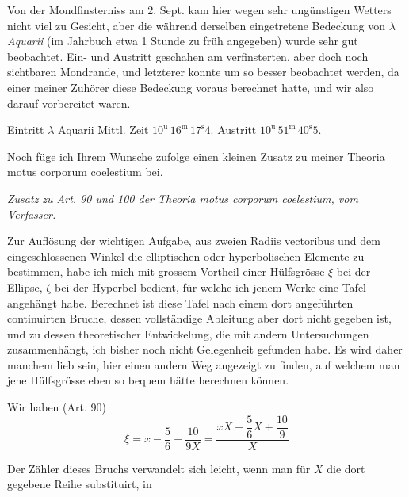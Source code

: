 \par\indent Von der Mondfinsterniss am 2. Sept. kam hier wegen sehr ungünstigen Wetters nicht viel zu Gesicht, aber die während derselben eingetretene Bedeckung von $\lambda$ \emph{Aquarii} (im Jahrbuch etwa 1 Stunde zu früh angegeben) wurde sehr gut beobachtet. Ein- und Austritt geschahen am verfinsterten, aber doch noch sichtbaren Mondrande, und letzterer konnte um so besser beobachtet werden, da einer meiner Zuhörer diese Bedeckung voraus berechnet hatte, und wir also darauf vorbereitet waren.

\par\indent Eintritt $\lambda$ Aquarii Mittl. Zeit $10^{\mathrm u}\,16^{\mathrm m}\,17^{\mathrm s}4$. Austritt $10^{\mathrm u}\,51^{\mathrm m}\,40^{\mathrm s}5$.

\par\indent Noch füge ich Ihrem Wunsche zufolge einen kleinen Zusatz zu meiner Theoria motus corporum coelestium bei.
\begin{center}\emph{Zusatz zu Art. 90 und 100 der Theoria motus corporum coelestium, vom Verfasser.}\end{center}
\par\indent Zur Auflösung der wichtigen Aufgabe, aus zweien Radiis vectoribus und dem eingeschlossenen Winkel die elliptischen oder hyperbolischen Elemente zu bestimmen, habe ich mich mit grossem Vortheil einer Hülfsgrösse $\xi$ bei der Ellipse, $\zeta$ bei der Hyperbel bedient, für welche ich jenem Werke eine Tafel angehängt habe. Berechnet ist diese Tafel nach einem dort angeführten continuirten Bruche, dessen vollständige Ableitung aber dort nicht gegeben ist, und zu dessen theoretischer Entwickelung, die mit andern Untersuchungen zusammenhängt, ich bisher noch nicht Gelegenheit gefunden habe. Es wird daher manchem lieb sein, hier einen andern Weg angezeigt zu finden, auf welchem man jene Hülfsgrösse eben so bequem hätte berechnen können.

\par\indent Wir haben (Art. 90)
\[
\xi=x-\frac{5}{6}+\frac{10}{9X}=\frac{xX-\dfrac{5}{6}X+\dfrac{10}{9}}{X}
\]
\par\indent Der Zähler dieses Bruchs verwandelt sich leicht, wenn man für $X$ die dort gegebene Reihe substituirt, in

